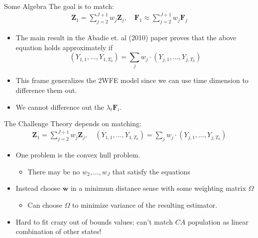 \documentclass[aspectratio=169,11pt]{beamer}
\begin{document}
\begin{frame}{Some Algebra}
The goal is to match:
\begin{align*}
\mathbf{Z}_{1}= \sum_{j=2}^{J+1} w_{j} \mathbf{Z}_{j}, \quad
\mathbf{F}_{1} \approx \sum_{j=2}^{J+1} w_{j} \mathbf{F}_{j} 
\end{align*}
\begin{itemize}
\item The main result in the Abadie et. al (2010) paper proves that the above equation holds approximately if 
$$\left({Y_{1,1},\ldots, Y_{1,T_0}} \right)= \sum_j w_j \cdot \left({Y_{j,1},\ldots, Y_{j,T_0}} \right)$$
\item This frame generalizes the 2WFE model since we can use time dimension to difference them out.
\item We cannot difference out the $\lambda_t \mathbf{F}_i$.
\end{itemize}
\end{frame}


\begin{frame}{The Challenge}
Theory depends on matching:
\begin{align*}
\mathbf{Z}_{1}= \sum_{j=2}^{J+1} w_{j} \mathbf{Z}_{j}, \quad
\left({Y_{1,1},\ldots, Y_{1,T_0}} \right)= \sum_j w_j \cdot \left({Y_{j,1},\ldots, Y_{j,T_0}} \right)
\end{align*}
\begin{itemize}
\item One problem is the \alert{convex hull} problem. 
\begin{itemize}
\item There may be no $w_2,\ldots,w_J$ that satisfy the equations 
\end{itemize}
\item Instead choose $\mathbf{w}$ in a \alert{minimum distance sense} with some weighting matrix $\Omega$
\begin{itemize}
\item Can choose $\Omega$ to minimize variance of the resulting estimator.
\end{itemize}
\item Hard to fit crazy out of bounds values: can't match $CA$ population as linear combination of other states!
\end{itemize}
\end{frame}
\end{document}
